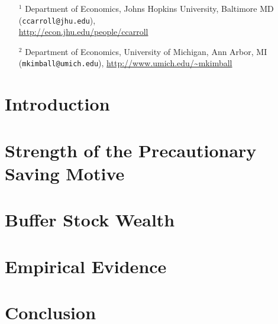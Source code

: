 \documentclass[12pt,letterpaper]{econtex}
\begin{document}
\begin{titlepage}
\begin{small}
\begin{itemize}
\item[$^1$] Department of Economics, Johns Hopkins University, Baltimore MD (\texttt{ccarroll@jhu.edu}),
\\ \url{http://econ.jhu.edu/people/ccarroll}

\item[$^2$] Department of Economics, University of Michigan, Ann Arbor, MI (\texttt{mkimball@umich.edu}), \url{http://www.umich.edu/~mkimball}
\end{itemize}

\end{small}

\end{titlepage}


\setlength{\footskip}{36pt}

\pagestyle{plain}\thispagestyle{empty}

\titlepage

\tableofcontents

\pagebreak

\section{Introduction}\label{sec:Intro}



\section{Strength of the Precautionary Saving Motive}\label{sec:Strength}



\section{Buffer Stock Wealth}\label{sec:BufferStockWealth}



\section{Empirical Evidence}\label{sec:EmpiricalEvidence}



\section{Conclusion}\label{sec:Conclusion}



\pagebreak


\end{document}
